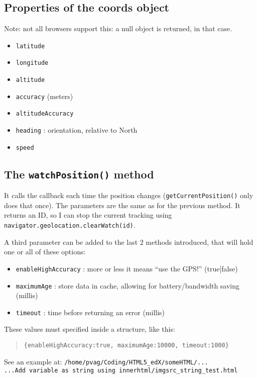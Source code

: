 \documentclass[a4paper,11pt]{book}
\begin{document}
\subsection{Properties of the coords object}
Note: not all browsers support this: a null object is returned, in that case.
\begin{itemize}
\item \texttt{latitude}
\item \texttt{longitude}
\item \texttt{altitude}
\item \texttt{accuracy} (meters)
\item \texttt{altitudeAccuracy}
\item \texttt{heading} : orientation, relative to North
\item \texttt{speed}
\end{itemize}

\subsection{The \texttt{watchPosition()} method}
It calls the callback each time the position changes (\texttt{getCurrentPosition()}
only does that once). The parameters are the same as for the previous method.
It returns an ID, so I can stop the current tracking using
\texttt{navigator.geolocation.clearWatch(id)}.

A third parameter can be added to the last 2 methods introduced, that will hold
one or all of these options:
\begin{itemize}
\item \texttt{enableHighAccuracy} : more or less it means ``use the GPS!'' (true|false)
\item \texttt{maximumAge} : store data in cache, allowing for battery/bandwidth saving (millis)
\item \texttt{timeout} : time before returning an error (millis)
\end{itemize}
These values must specified inside a structure, like this:
\begin{verse}
\begin{verbatim}
{enableHighAccuracy:true, maximumAge:10000, timeout:1000}
\end{verbatim}
\end{verse}
See an example at:
\texttt{/home/pvag/Coding/HTML5\_edX/someHTML/...} \\
\texttt{...Add variable as string using innerhtml/imgsrc\_string\_test.html}
\end{document}
